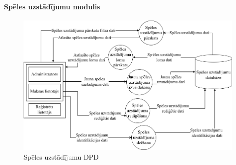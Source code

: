 \paragraph{Spēles uzstādījumu modulis}

\begin{figure}[htbp]
	\centering
	\includegraphics[width=\linewidth]{./src/img/SpēlesUzstādījumuModulis.png}
	\caption{Spēles uzstādījumu DPD}
	\label{fig:dpd-2-game-setup}
\end{figure}






